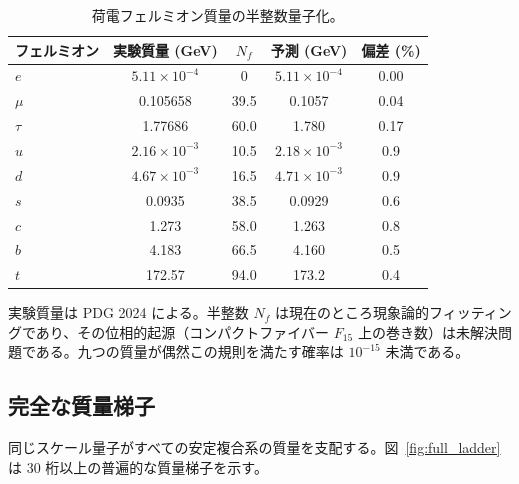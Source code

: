 \documentclass[12pt,a4paper]{article}
\theoremstyle{remark}
\begin{document}
	\begin{table}[htbp]
		\centering
		\caption{荷電フェルミオン質量の半整数量子化。}
		\label{tab:fermions}
		\small
		\begin{tabular}{l c c c c}
			\toprule
			フェルミオン & 実験質量 (GeV) & \(N_f\) & 予測 (GeV) & 偏差 (\%) \\
			\midrule
			\(e\)   & \(5.11\times10^{-4}\) & 0      & \(5.11\times10^{-4}\) & 0.00 \\
			\(\mu\)  & 0.105658             & 39.5   & 0.1057               & 0.04 \\
			\(\tau\) & 1.77686              & 60.0   & 1.780                & 0.17 \\
			\(u\)   & \(2.16\times10^{-3}\) & 10.5   & \(2.18\times10^{-3}\) & 0.9 \\
			\(d\)   & \(4.67\times10^{-3}\) & 16.5   & \(4.71\times10^{-3}\) & 0.9 \\
			\(s\)   & 0.0935               & 38.5   & 0.0929               & 0.6 \\
			\(c\)   & 1.273                & 58.0   & 1.263                & 0.8 \\
			\(b\)   & 4.183                & 66.5   & 4.160                & 0.5 \\
			\(t\)   & 172.57               & 94.0   & 173.2                & 0.4 \\
			\bottomrule
		\end{tabular}
		\par\smallskip
		\footnotesize
		実験質量は PDG 2024 による。半整数 \(N_f\) は現在のところ現象論的フィッティングであり、その位相的起源（コンパクトファイバー \(F_{15}\) 上の巻き数）は未解決問題である。九つの質量が偶然この規則を満たす確率は \(10^{-15}\) 未満である。
	\end{table}
	
	\subsection{完全な質量梯子}
	
	同じスケール量子がすべての安定複合系の質量を支配する。図~\ref{fig:full_ladder} は 30 桁以上の普遍的な質量梯子を示す。
	
\end{document}
